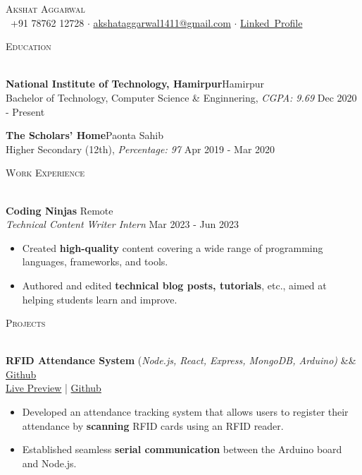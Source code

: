 \documentclass[a4paper]{article}
\newcommand{\bulletSep} { \vspace{2.2mm} }
\newcommand{\sectionSep} { \vspace{3mm} }
\newcommand{\lineunder} {
    \vspace*{-8pt} \\
    \hspace*{-15pt} \hrulefill \\
}
\newcommand{\header} [1] {
    {\hspace*{-18pt}\vspace*{6pt} {
        \fontfamily{qcs}\selectfont \large \scshape #1
    }}
    \vspace*{-6pt} \lineunder
    \vspace{0.5mm}
}
\newcommand{\educationItem}[5]{
    \textbf{#1}\hfill #2\\
    #3, \textit{#4} \hfill #5\\
}
\newcommand{\experienceItem}[5]{
    \textbf{#1} \hfill #2 \\
    \textit{#3} \hfill #4 \\
    \begin{itemize}
        #5
    \end{itemize}
}
\newcommand{\projectItem}[5]{
    {\textbf{#1}} {(\sl #2)}\hfill
    \ifx&#3&%
    \href{#4}{Github}\\
    \else
    \href{#3}{Live Preview} | \href{#4}{Github}\\
    \fi
    \begin{itemize}
        #5
    \end{itemize}
}
\begin{document}

\begin{center}
    {\Huge \scshape {}\selectfont Akshat Aggarwal}\\
    \vspace{0.5mm}
    \faPhone~+91 78762 12728
    $\cdot$
    \href{mailto:akshataggarwal1411@gmail.com}{akshataggarwal1411@gmail.com}
    $\cdot$
    \href{https://www.linkedin.com/in/akshataggarwal1411/}{Linked\faLinkedinSquare~Profile}
\end{center}

\vspace{-2mm}


\header{Education}

\educationItem{National Institute of Technology, Hamirpur}{Hamirpur}{Bachelor of Technology, Computer Science \& Enginnering}{CGPA: 9.69}{Dec 2020 - Present}
\bulletSep

\educationItem{The Scholars' Home}{Paonta Sahib}{Higher Secondary (12th)}{Percentage: 97}{Apr 2019 - Mar 2020}
\sectionSep


\header{Work Experience}

\experienceItem{Coding Ninjas}{Remote}{Technical Content Writer Intern}{Mar 2023 - Jun 2023}{
    \item Created \textbf{high-quality} content covering a wide range of programming languages, frameworks, and tools.
    \item Authored and edited \textbf{technical blog posts, tutorials}, etc., aimed at helping students learn and improve.
}
\bulletSep



\header{Projects}

\projectItem{RFID Attendance System}{Node.js, React, Express, MongoDB, Arduino}{}{https://github.com/AkshatAggarwal14/RFID-Attendance-system}{
    \item Developed an attendance tracking system that allows users to register their attendance by \textbf{scanning} RFID cards using an RFID reader.
    \item Established seamless \textbf{serial communication} between the Arduino board and Node.js.
}
\bulletSep
\end{document}
